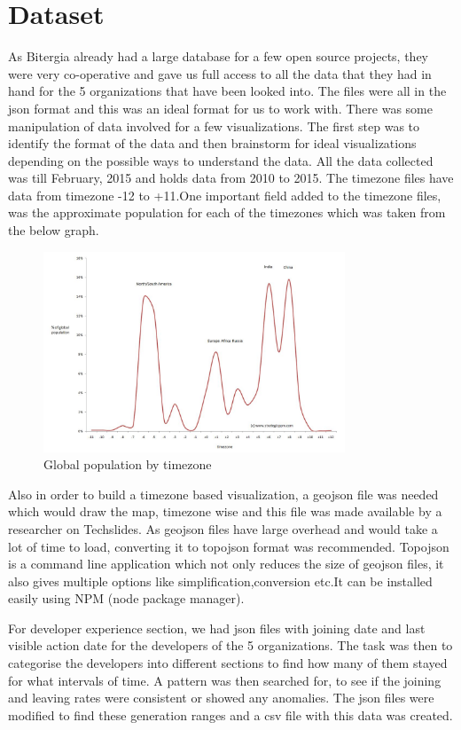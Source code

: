 \documentclass[seploa]{beavtex}
\begin{document}
\section{Dataset}
As Bitergia already had a large database for a few open source projects, they were very co-operative and gave us full access to all the data that they had in hand for the 5 organizations that have been looked into. The files were all in the json format and this was an ideal format for us to work with. There was some manipulation of data involved for a few visualizations. The first step was to identify the format of the data and then brainstorm for ideal visualizations depending on the possible ways to understand the data. All the data collected was till February, 2015 and holds data from 2010 to 2015. The timezone files have data from timezone -12 to +11.One important field added to the timezone files, was the approximate population for each of the timezones which was taken from the below graph.

\begin{figure}[!ht]
\centering
\includegraphics[width=90mm]{pop1.jpg}
\caption{Global population by timezone}
\end{figure}

Also in order to build a timezone based visualization, a geojson file was needed which would draw the map, timezone wise and this file was made available by a researcher on Techslides. As geojson files have large overhead and would take a lot of time to load, converting it to topojson format was recommended\cite{tech}. Topojson is a command line application which not only reduces the size of geojson files, it also gives multiple options like simplification,conversion etc.It can be installed easily using NPM (node package manager). 

For developer experience section, we had json files with joining date and last visible action date for the developers of the 5 organizations. The task was then to categorise the developers into different sections to find how many of them stayed for what intervals of time. A pattern was then searched for, to see if the joining and leaving rates were consistent or showed any anomalies. The json files were modified to find these generation ranges and a csv file with this data was created.
\end{document}
